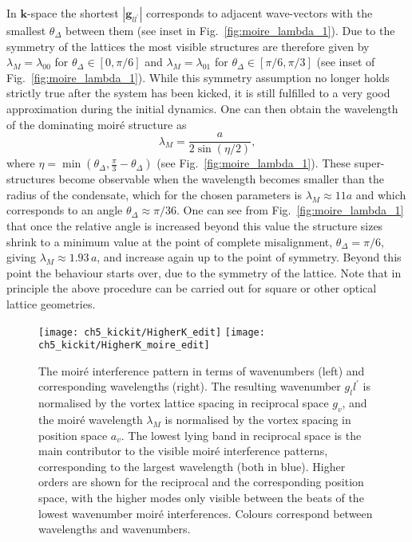 In $\mathbf{k}$-space the shortest $|\mathbf{g}_{ll^\prime}|$ corresponds to adjacent wave-vectors with the smallest $\theta_\Delta$ between them (see inset in Fig.~\ref{fig:moire_lambda_1}). Due to the symmetry of the lattices the most visible structures are therefore given by $\lambda_M=\lambda_{00}$ for $\theta_\Delta\in[0,\pi/6]$ and $\lambda_M=\lambda_{01}$ for $\theta_\Delta\in[\pi/6,\pi/3]$ (see inset of Fig.~\ref{fig:moire_lambda_1}).
While this symmetry assumption no longer holds strictly true after the system has been kicked, it is still fulfilled to a very good approximation during the initial dynamics. One can then obtain the wavelength of the dominating moir\'e structure as~\cite{BIO:Blair_jneur_2007,SS:Yankowitz_natphys_2012}
    	\begin{equation}
    		\lambda_M = \frac{a}{2\sin(\eta/2)},
    		\label{eqn:moire_size}
    	\end{equation}
    where $\eta=\min(\theta_\Delta,\frac{\pi}{3} - \theta_\Delta ) $  (see Fig.~\ref{fig:moire_lambda_1}).
These super-structures become observable when the wavelength becomes smaller than the radius of the condensate, which for the chosen parameters is $\lambda_M \approx 11a$ and which corresponds to an angle $\theta_\Delta \approx \pi/36$.
One can see from Fig.~\ref{fig:moire_lambda_1} that once the relative angle is increased beyond this value the structure sizes shrink to a minimum value at the point of complete misalignment, $\theta_\Delta=\pi/6$, giving $\lambda_M\approx 1.93\,a$, and increase again up to the point of symmetry. Beyond this point the behaviour starts over, due to the symmetry of the lattice. Note that in principle the above procedure can be carried out for square or other optical lattice geometries.

\begin{figure}
    \centering
    \texttt{[image: ch5\_kickit/HigherK\_edit]}
    \texttt{[image: ch5\_kickit/HigherK\_moire\_edit]}
    \caption[The moir\'e interference pattern in terms of wavenumbers.]{The moir\'e interference pattern in terms of wavenumbers (left) and corresponding wavelengths (right). The resulting wavenumber $g_ll^{\prime}$ is normalised by the vortex lattice spacing in reciprocal space $g_v$, and the moir\'e wavelength $\lambda_M$ is normalised by the vortex spacing in position space $a_v$. The lowest lying band in reciprocal space is the main contributor to the visible moir\'e interference patterns, corresponding to the largest wavelength (both in blue). Higher orders are shown for the reciprocal and the corresponding position space, with the higher modes only visible between the beats of the lowest wavenumber moir\'e interferences. Colours correspond between wavelengths and wavenumbers.}\label{fig:moire_higher}
\end{figure}


